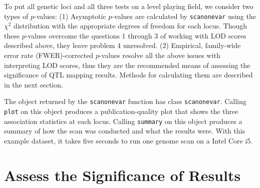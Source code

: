 \documentclass{article}
\begin{document}
To put all genetic loci and all three tests on a level playing field, we consider two types of $p$-values:
(1) Asymptotic $p$-values are calculated by \texttt{scanonevar} using the $\chi^2$ distribution with the appropriate degrees of freedom for each locus.
Though these $p$-values overcome the questions 1 through 3 of working with LOD scores described above, they leave problem 4 unresolved.
(2) Empirical, family-wide error rate (FWER)-corrected $p$-values resolve all the above issues with interpreting LOD scores, thus they are the recommended means of assessing the significance of QTL mapping results.
Methods for calculating them are described in the next section.

The object returned by the \texttt{scanonevar} function has class \texttt{scanonevar}.
Calling \texttt{plot} on this object produces a publication-quality plot that shows the three association statistics at each locus.
Calling \texttt{summary} on this object produces a summary of how the scan was conducted and what the results were.
With this example dataset, it takes five seconds to run one genome scan on a Intel Core i5.




\section*{Assess the Significance of Results}
\end{document}
